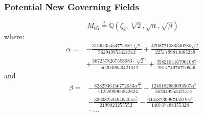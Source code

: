 \documentclass[12pt]{beamer}
\begin{document}
	\begin{frame}
	\frametitle{Potential New Governing Fields}
		$$M_{05} \stackrel{?}{=}\mathbb{Q}\left(\zeta_8, \sqrt[4]{2}, \sqrt{\alpha}, \sqrt{\beta}\right)$$
		where:
		\begin{align*}
			\alpha =
			&- \frac{3136435454775881 \sqrt[4]{2}}{562949953421312} + \frac{4208721080340285 \sqrt{2}}{2251799813685248} \\
			&+ \frac{3672578267558083 \cdot \sqrt[4]{2}^3}{562949953421312} + \frac{3582104167901087}{281474976710656}
		\end{align*}
		and
		\begin{align*}
		\beta = 
		&- \frac{8282936156772053 \alpha^{\frac{13}{2}}}{1125899906842624} 
		- \frac{1240182980093567 \alpha^{6}}{562949953421312} \\
		&- \frac{336382584949535 \alpha^{\frac{9}{2}}}{2199023255552} 
		- \frac{6445823996745319 \alpha^{4}}{140737488355328} \\
		&-\dots \\
		\end{align*}
	\end{frame}
\end{document}
